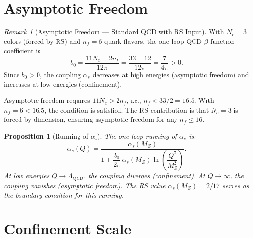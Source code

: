 \documentclass[12pt,a4paper]{article}
\newtheorem{proposition}[theorem]{Proposition}
\theoremstyle{definition}
\theoremstyle{remark}
\newtheorem{remark}[theorem]{Remark}
\begin{document}
\section{Asymptotic Freedom}
\label{sec:af}

\begin{remark}[Asymptotic Freedom --- Standard QCD with RS Input]
\label{thm:af}
With $N_c = 3$ colors (forced by RS) and $n_f = 6$ quark flavors, the
one-loop QCD $\beta$-function coefficient is
\begin{equation}
  b_0 = \frac{11 N_c - 2 n_f}{12\pi}
  = \frac{33 - 12}{12\pi} = \frac{7}{4\pi} > 0.
\end{equation}
Since $b_0 > 0$, the coupling $\alpha_s$ decreases at high
energies (asymptotic freedom) and increases at low energies
(confinement).

Asymptotic freedom requires $11 N_c > 2 n_f$, i.e.,
$n_f < 33/2 = 16.5$.  With $n_f = 6 < 16.5$, the condition is
satisfied.  The RS contribution is that $N_c = 3$ is forced by
dimension, ensuring asymptotic freedom for any $n_f \leq 16$.
\end{remark}

\begin{proposition}[Running of $\alpha_s$]
\label{prop:running}
The one-loop running of $\alpha_s$ is:
\begin{equation}
  \alpha_s(Q) = \frac{\alpha_s(M_Z)}{1 + \dfrac{b_0}{2\pi}\,
  \alpha_s(M_Z) \ln\!\left(\dfrac{Q^2}{M_Z^2}\right)}.
\end{equation}
At low energies $Q \to \Lambda_{\mathrm{QCD}}$, the coupling
diverges (confinement).  At $Q \to \infty$, the coupling
vanishes (asymptotic freedom).  The RS value
$\alpha_s(M_Z) = 2/17$ serves as the boundary condition for
this running.
\end{proposition}

\section{Confinement Scale}
\label{sec:lambda}
\end{document}
